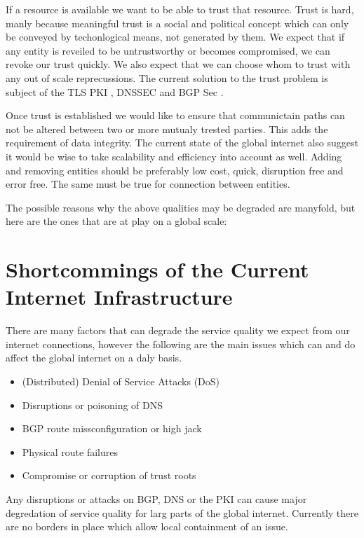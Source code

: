 \documentclass[../eva1_scion.tex]{subfiles}
\begin{document}
If a resource is available we want to be able to trust that resource. Trust is hard, manly because meaningful trust is a social and political concept which can only be conveyed by techonlogical means, not generated by them. We expect that if any entity is reveiled to be untrustworthy or becomes compromised, we can revoke our trust quickly. We also expect that we can choose whom to trust with any out of scale reprecussions. The current solution to the trust problem is subject of the TLS PKI \cite{tls_pki}, DNSSEC \cite{dnssec} and BGP Sec \cite{bgpsec}.

Once trust is established we would like to ensure that communictain paths can not be altered between two or more mutualy trested parties. This adds the requirement of data integrity. The current state of the global internet also suggest it would be wise to take scalability and efficiency into account as well. Adding and removing entities should be preferably low cost, quick, disruption free and error free. The same must be true for connection between entities.

The possible reasons why the above qualities may be degraded are manyfold, but here are the ones that are at play on a global scale:

\section{Shortcommings of the Current Internet Infrastructure}%
\label{sec:shortcommings}

There are many factors that can degrade the service quality we expect from our internet connections, however the following are the main issues which can and do affect the global internet on a daly basis.

\begin{itemize}
    \item (Distributed) Denial of Service Attacks (DoS)
    \item Disruptions or poisoning of DNS
    \item BGP route missconfiguration or high jack
    \item Physical route failures
    \item Compromise or corruption of trust roots
\end{itemize}

Any disruptions or attacks on BGP, DNS or the PKI can cause major degredation of service quality for larg parts of the global internet. Currently there are no borders in place which allow local containment of an issue.
\end{document}
